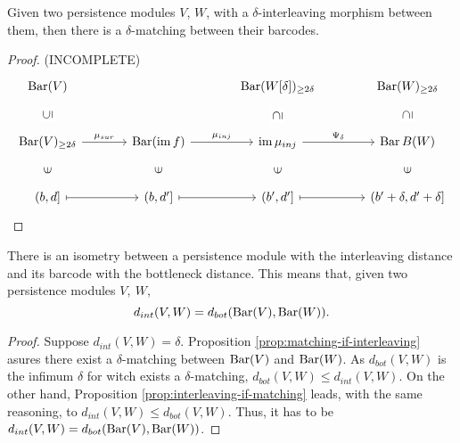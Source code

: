 \begin{proposition} \cite[Theorem 3.0.2]{polterovich} \label{prop:matching-if-interleaving}
    Given two persistence modules $ V $, $ W $, with a $\delta$-interleaving morphism between them, then there is a $ \delta$-matching between their barcodes.
\end{proposition}
\begin{proof} (INCOMPLETE)
    $$
    \begin{tikzcd}[column sep=large, row sep=large]
        \barc(V)
        &
        & \barc(W[\delta])_{\geq 2 \delta} 
        & \barc(W)_{\geq 2 \delta} \\
        \barc(V)_{\geq 2\delta} \arrow[r, "\mu_{sur}"] \arrow[u, phantom, "{\rotatebox{90}{$\subseteq$}}" description]
        & \barc(\im f) \arrow[r, "\mu_{inj}"]
        & \im \mu_{inj} \arrow[r, "\Psi_\delta"] \arrow[u, phantom, "{\rotatebox{90}{$\supseteq$}}" description]
        & \barc{B}(W) \arrow[u, phantom, "{\rotatebox{90}{$\supseteq$}}" description]\\
        (b, d] \arrow[r, mapsto] \arrow[u, phantom, "{\rotatebox{90}{$\in$}}"]
        & (b, d'] \arrow[r, mapsto] \arrow[u, phantom, "{\rotatebox{90}{$\in$}}"]
        & (b', d'] \arrow[r, mapsto] \arrow[u, phantom, "{\rotatebox{90}{$\in$}}"] 
        & (b' + \delta, d' + \delta] \arrow[u, phantom, "{\rotatebox{90}{$\in$}}"]
    \end{tikzcd}
    $$
\end{proof}

\begin{theorem}[Stability] \cite[Theorem 2.2.8]{polterovich}
    There is an isometry between a persistence module with the interleaving distance and its barcode with the bottleneck distance. This means that, given two persistence modules $ V, \ W $, 
    $$ 
        d_{int} (V, W) = d_{bot} (\operatorname{Bar}(V), \operatorname{Bar}(W)).
    $$
\end{theorem}
\begin{proof}
    Suppose $ d_{int}(V, W) = \delta $. Proposition \ref{prop:matching-if-interleaving} asures there exist a $\delta$-matching between $ \operatorname{Bar}(V) $ and $ \operatorname{Bar} (W) $. As $ d_{bot}(V, W) $ is the infimum $\delta$ for witch exists a $\delta$-matching, $ d_{bot}(V, W) \leq d_{int}(V, W)$. On the other hand, Proposition \ref{prop:interleaving-if-matching} leads, with the same reasoning, to $ d_{int}(V, W) \leq d_{bot}(V, W)$. Thus, it has to be $ d_{int} (V, W) = d_{bot} (\operatorname{Bar}(V), \operatorname{Bar}(W)) $.
\end{proof}
